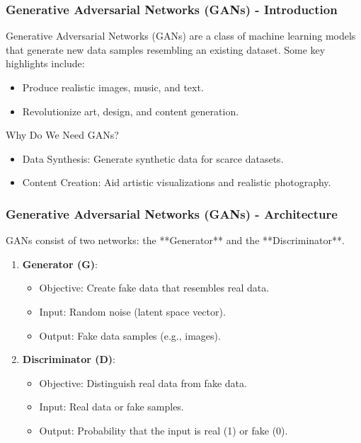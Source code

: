 \documentclass[aspectratio=169]{beamer}
\begin{document}
\begin{frame}[fragile]
    \frametitle{Generative Adversarial Networks (GANs) - Introduction}
    Generative Adversarial Networks (GANs) are a class of machine learning models that generate new data samples resembling an existing dataset. Some key highlights include:
    \begin{itemize}
        \item Produce realistic images, music, and text.
        \item Revolutionize art, design, and content generation.
    \end{itemize}
    \begin{block}{Why Do We Need GANs?}
        \begin{itemize}
            \item Data Synthesis: Generate synthetic data for scarce datasets.
            \item Content Creation: Aid artistic visualizations and realistic photography.
        \end{itemize}
    \end{block}
\end{frame}

\begin{frame}[fragile]
    \frametitle{Generative Adversarial Networks (GANs) - Architecture}
    GANs consist of two networks: the **Generator** and the **Discriminator**.
    \begin{enumerate}
        \item \textbf{Generator (G)}:
            \begin{itemize}
                \item Objective: Create fake data that resembles real data.
                \item Input: Random noise (latent space vector).
                \item Output: Fake data samples (e.g., images).
            \end{itemize}
        \item \textbf{Discriminator (D)}:
            \begin{itemize}
                \item Objective: Distinguish real data from fake data.
                \item Input: Real data or fake samples.
                \item Output: Probability that the input is real (1) or fake (0).
            \end{itemize}
    \end{enumerate}
\end{frame}
\end{document}
